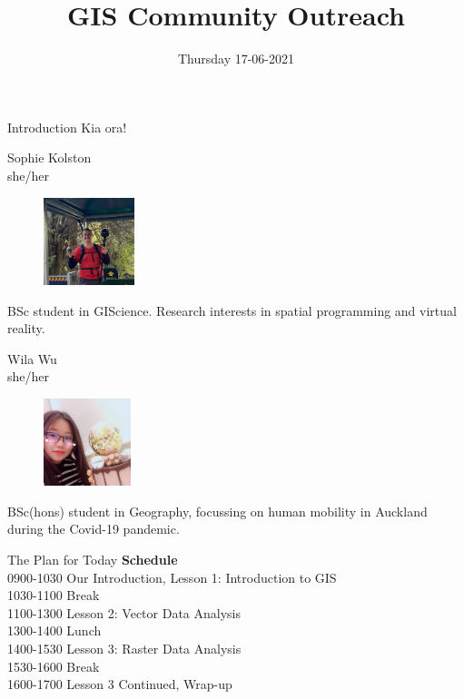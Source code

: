 \documentclass{beamer}
\title{GIS Community Outreach}
\institute{University of Auckland}
\date{Thursday 17-06-2021}
\begin{document}
\begin{frame}
\titlepage
\end{frame}

\begin{frame}{Introduction}
Kia ora!
\vspace{1cm}

\begin{minipage}{.5\textwidth}
  \centering
  Sophie Kolston\\
  \tiny she/her
  \noindent
  \begin{figure}
    \includegraphics[width=100px]{images/sophie_cropped.jpg}
  \end{figure}
  \tiny BSc student in GIScience. Research interests in spatial programming and virtual reality.
\end{minipage}%
\begin{minipage}{.5\textwidth}
  \centering
  Wila Wu\\
  \tiny she/her
  \noindent
  \begin{figure}
    \includegraphics[width=96px]{images/wila.PNG}
  \end{figure}
  \tiny BSc(hons) student in Geography, focussing on human mobility in Auckland during the Covid-19 pandemic.
\end{minipage}

\end{frame}

\begin{frame}{The Plan for Today}
    \textbf{Schedule}\\
    0900-1030 Our Introduction, Lesson 1: Introduction to GIS\\
    1030-1100 Break\\
    1100-1300 Lesson 2: Vector Data Analysis\\
    1300-1400 Lunch\\
    1400-1530 Lesson 3: Raster Data Analysis\\
    1530-1600 Break\\
    1600-1700 Lesson 3 Continued, Wrap-up
\end{frame}
\end{document}

